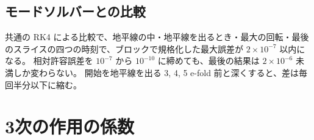 \documentclass[a4paper,11pt]{ltjsarticle}
\begin{document}
\subsection{モードソルバーとの比較}
共通の RK4 による比較で、地平線の中・地平線を出るとき・最大の回転・最後のスライスの四つの時刻で、ブロックで規格化した最大誤差が $2\times10^{-7}$ 以内になる。
相対許容誤差を $10^{-7}$ から $10^{-10}$ に締めても、最後の結果は $2\times10^{-6}$ 未満しか変わらない。
開始を地平線を出る 3, 4, 5 e-fold 前と深くすると、差は毎回半分以下に縮む。

\section{3次の作用の係数}
\label{app:cubic}
\end{document}
